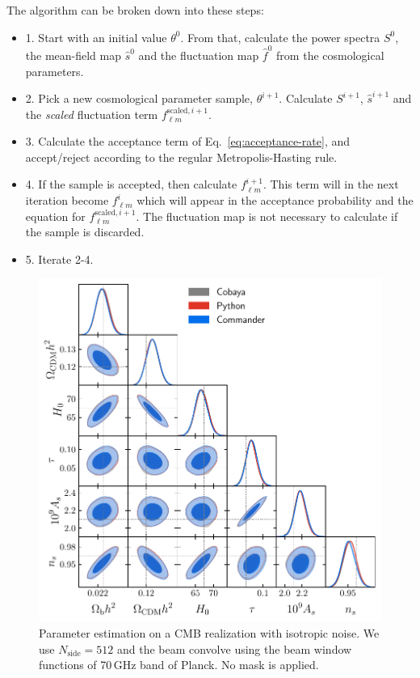 \documentclass[twocolumn]{../common/aa}
\begin{document}
The algorithm can be broken down into these steps:
\begin{itemize}
    \item 1. Start with an initial value $\theta^0$. From that, calculate the power spectra $S^0$, the mean-field map $\hat{s}^0$ and the fluctuation map $\hat{f}^0$ from the cosmological parameters.
    \item 2. Pick a new cosmological parameter sample, $\theta^{i+1}$. Calculate $S^{i+1}$, $\hat{s}^{i+1}$ and the \textit{scaled} fluctuation term $f_{\ell m}^{\textrm{scaled}, i+1}$.
    \item 3. Calculate the acceptance term of Eq.~\ref{eq:acceptance-rate}, and accept/reject according to the regular Metropolis-Hasting rule.
    \item 4. If the sample is accepted, then calculate $f_{\ell m}^{i+1}$. This term will in the next iteration become $f_{\ell m}^{i}$ which will appear in the acceptance probability and the equation for $f_{\ell m}^{\textrm{scaled}, i+1}$. The fluctuation map is not necessary to calculate if the sample is discarded.
    \item 5. Iterate 2-4.
\end{itemize}

\begin{figure}
	\centering
	\includegraphics[width=\linewidth]{figures/dist_posterior_no_mask.pdf}
	\caption{\label{fig:nomask}Parameter estimation on a CMB realization with isotropic noise. We use $N_{\mathrm{side}}=512$ and the beam convolve using the beam window functions of 70\,GHz band of Planck. No mask is applied.}
\end{figure}
\end{document}
